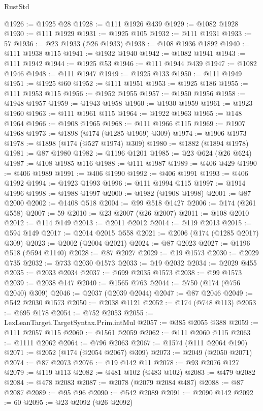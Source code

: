 \begin{lexlean}{RustStd}
\begin{coremodule}
@1926 := @1925 @28
@1928 := @111 @1926 @439
@1929 := @1082 @1928
@1930 := @111 @1929
@1931 := @1925 @105
@1932 := @111 @1931
@1933 := 57
@1936 := @23 @1933 (@26 @1933)
@1938 := @108 @1936 @1892
@1940 := @111 @1938 @115
@1941 := @1932 @1940
@1942 := @1082 @1941
@1943 := @111 @1942
@1944 := @1925 @53
@1946 := @111 @1944 @439
@1947 := @1082 @1946
@1948 := @111 @1947
@1949 := @1925 @133
@1950 := @111 @1949
@1951 := @1925 @60
@1952 := @111 @1951
@1953 := @1925 @186
@1955 := @111 @1953 @115
@1956 := @1952 @1955
@1957 := @1950 @1956
@1958 := @1948 @1957
@1959 := @1943 @1958
@1960 := @1930 @1959
@1961 := @1923 @1960
@1963 := @111 @1961 @115
@1964 := @1922 @1963
@1965 := @148 @1964
@1966 := @1908 @1965
@1968 := @111 @1966 @115
@1969 := @1907 @1968
@1973 := @1898 (@174 (@1285 @1969) @309)
@1974 := @1906 @1973
@1978 := @1898 (@174 (@527 @1974) @309)
@1980 := @1882 (@1894 @1978)
@1981 := @87 @1980
@1982 := @1196 @1201
@1985 := @23 @624 (@26 @624)
@1987 := @108 @1985 @116
@1988 := @111 @1987
@1989 := @406 @429
@1990 := @406 @1989
@1991 := @406 @1990
@1992 := @406 @1991
@1993 := @406 @1992
@1994 := @1923 @1993
@1996 := @111 @1994 @115
@1997 := @1914 @1996
@1998 := @1988 @1997
@2000 := @1982 (@1908 @1998)
@2001 := @87 @2000
@2002 := @1408 @518
@2004 := @99 @518 @1427
@2006 := @174 (@261 @558)
@2007 := 59
@2010 := @23 @2007 (@26 @2007)
@2011 := @108 @2010
@2012 := @114 @149
@2013 := @2011 @2012
@2014 := @119 @2013
@2015 := @594 @149
@2017 := @2014 @2015 @558
@2021 := @2006 (@174 (@1285 @2017) @309)
@2023 := @2002 (@2004 @2021)
@2024 := @87 @2023
@2027 := @1196 @518 (@594 @1140)
@2028 := @87 @2027
@2029 := @19 @1573
@2030 := @2029 @735
@2032 := @733 @2030 @1573
@2033 := @19 @2032
@2034 := @2029 @455
@2035 := @2033 @2034
@2037 := @699 @2035 @1573
@2038 := @99 @1573
@2039 := @2038 @147
@2040 := @1565 @763
@2044 := @750 (@174 (@756 @2040) @309)
@2046 := @2037 (@2039 @2044)
@2047 := @87 @2046
@2049 := @542 @2030 @1573
@2050 := @2038 @1121
@2052 := @174 (@748 @113)
@2053 := @695 @178
@2054 := @752 @2053
@2055 := LexLeanTarget.TargetSyntax.Prim.intMul
@2057 := @385 @2055 @388
@2059 := @111 @2057 @115
@2060 := @1561 @2059
@2062 := @111 @2060 @115
@2063 := @1111 @2062
@2064 := @796 @2063
@2067 := @1574 (@111 @2064 @190)
@2071 := @2052 (@174 (@2054 @2067) @309)
@2073 := @2049 (@2050 @2071)
@2074 := @87 @2073
@2076 := @19 @142 @11
@2078 := @93 @2076 @127
@2079 := @119 @113
@2082 := @481 @102 (@483 @102)
@2083 := @479 @2082
@2084 := @478 @2083
@2087 := @2078 (@2079 @2084 @487)
@2088 := @87 @2087
@2089 := @95 @96
@2090 := @542 @2089
@2091 := @2090 @142
@2092 := 60
@2095 := @23 @2092 (@26 @2092)

\end{coremodule}
\end{lexlean}
